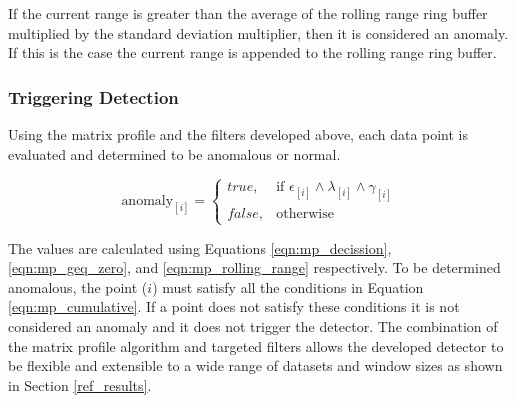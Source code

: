 If the current range is greater than the average of the rolling range ring buffer multiplied by the standard deviation multiplier, then it is considered an anomaly. If this is the case the current range is appended to the rolling range ring buffer.

\subsubsection{Triggering Detection}

Using the matrix profile and the filters developed above, each data point is evaluated and determined to be anomalous or normal.

\begin{equation}
    \label{eqn:mp_cumulative}
    \text{anomaly}_{[i]}=
    \begin{cases}
        true,& \text{if } \epsilon_{[i]} \land \lambda_{[i]} \land \gamma_{[i]}\\
        false,              & \text{otherwise}
    \end{cases}
\end{equation}

The values are calculated using Equations \eqref{eqn:mp_decission}, \eqref{eqn:mp_geq_zero}, and \eqref{eqn:mp_rolling_range} respectively. To be determined anomalous, the point ($i$) must satisfy all the conditions in Equation \eqref{eqn:mp_cumulative}. If a point does not satisfy these conditions it is not considered an anomaly and it does not trigger the detector. The combination of the matrix profile algorithm and targeted filters allows the developed detector to be flexible and extensible to a wide range of datasets and window sizes as shown in Section \ref{ref_results}.

